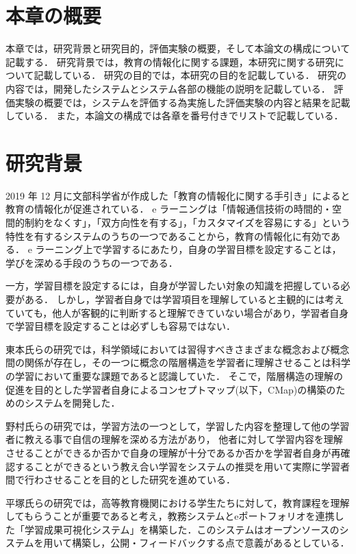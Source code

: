 \section{本章の概要}
本章では，研究背景と研究目的，評価実験の概要，そして本論文の構成について記載する．
研究背景では，教育の情報化に関する課題，本研究に関する研究について記載している．
研究の目的では，本研究の目的を記載している．
研究の内容では，開発したシステムとシステム各部の機能の説明を記載している．
評価実験の概要では，システムを評価する為実施した評価実験の内容と結果を記載している．
また，本論文の構成では各章を番号付きでリストで記載している．

\section{研究背景}
2019 年 12 月に文部科学省が作成した「教育の情報化に関する手引き」\cite{tebiki}によると教育の情報化が促進されている．
e ラーニング\cite{e}は「情報通信技術の時間的・空間的制約をなくす」，「双方向性を有する」，「カスタマイズを容易にする」という特性を有するシステムのうちの一つであることから，教育の情報化に有効である．
e ラーニング上で学習するにあたり，自身の学習目標を設定することは，学びを深める手段のうちの一つである\cite{seman}．

一方，学習目標を設定するには，自身が学習したい対象の知識を把握している必要がある．
しかし，学習者自身では学習項目を理解していると主観的には考えていても，他人が客観的に判断すると理解できていない場合があり，学習者自身で学習目標を設定することは必ずしも容易ではない．

東本氏らの研究では，科学領域においては習得すべきさまざまな概念および概念間の関係が存在し，その一つに概念の階層構造を学習者に理解させることは科学の学習において重要な課題であると認識していた．
そこで，階層構造の理解の促進を目的とした学習者自身によるコンセプトマップ(以下，CMap)\cite{concept}の構築のためのシステムを開発した\cite{toumoto}．

野村氏らの研究では，学習方法の一つとして，学習した内容を整理して他の学習者に教える事で自信の理解を深める方法があり，
他者に対して学習内容を理解させることができるか否かで自身の理解が十分であるか否かを学習者自身が再確認することができるという教え合い学習をシステムの推奨を用いて実際に学習者間で行わさせることを目的とした研究を進めている\cite{nomura}．

平塚氏らの研究では，高等教育機関における学生たちに対して，教育課程を理解してもらうことが重要であると考え，教務システムとeポートフォリオを連携した「学習成果可視化システム」を構築した．このシステムはオープンソースのシステムを用いて構築し，公開・フィードバックする点で意義があるとしている\cite{hira}．

